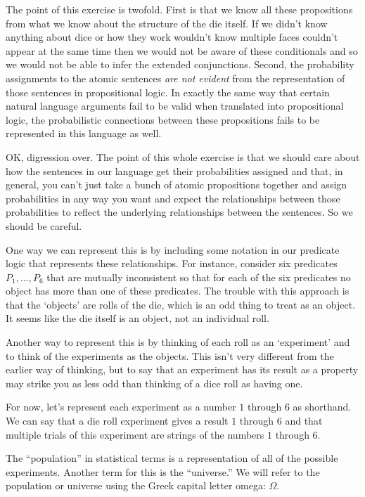 The point of this exercise is twofold. First is that we know all these propositions from what we know about the structure of the die itself. If we didn't know anything about dice or how they work wouldn't know multiple faces couldn't appear at the same time then we would not be aware of these conditionals and so we would not be able to infer the extended conjunctions. Second, the probability assignments to the atomic sentences \emph{are not evident} from the representation of those sentences in propositional logic. In exactly the same way that certain natural language arguments fail to be valid when translated into propositional logic, the probabilistic connections between these propositions fails to be represented in this language as well.

OK, digression over. The point of this whole exercise is that we should care about how the sentences in our language get their probabilities assigned and that, in general, you can't just take a bunch of atomic propositions together and assign probabilities in any way you want and expect the relationships between those probabilities to reflect the underlying relationships between the sentences. So we should be careful.

One way we can represent this is by including some notation in our predicate logic that represents these relationships. For instance, consider six predicates $P_1,\ldots,P_6$ that are mutually inconsistent so that for each of the six predicates no object has more than one of these predicates. The trouble with this approach is that the `objects' are rolls of the die, which is an odd thing to treat as an object. It seems like the die itself is an object, not an individual roll.

Another way to represent this is by thinking of each roll as an `experiment' and to think of the experiments as the objects. This isn't very different from the earlier way of thinking, but to say that an experiment has its result as a property may strike you as less odd than thinking of a dice roll as having one.

For now, let's represent each experiment as a number $1$ through $6$ as shorthand. We can say that a die roll experiment gives a result $1$ through $6$ and that multiple trials of this experiment are strings of the numbers $1$ through $6$.

The ``population'' in statistical terms is a representation of all of the possible experiments. Another term for this is the ``universe.'' We will refer to the population or universe using the Greek capital letter omega: $\Omega$.

